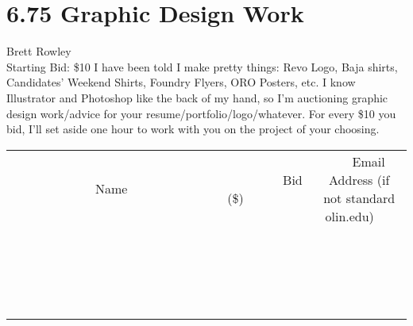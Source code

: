 \documentclass[11pt]{article}
\begin{document}
\section*{6.75 Graphic Design Work}
Brett Rowley
\\
Starting Bid: \$10
\newline
I have been told I make pretty things: Revo Logo, Baja shirts, Candidates' Weekend Shirts, Foundry Flyers, ORO Posters, etc. I know Illustrator and Photoshop like the back of my hand, so I'm auctioning graphic design work/advice for your resume/portfolio/logo/whatever. For every \$10 you bid, I'll set aside one hour to work with you on the project of your choosing.
\\[3ex]
\begin{tabular}{c c c}
~~~~~~~~~~~~~Name~~~~~~~~~~~~~ & ~~~~~~~~~Bid (\$)~~~~~~~~~  & ~~~Email Address (if not standard olin.edu)~~~\\
 & & \\
\hline
 & & \\
\hline
 & & \\
\hline
 & & \\
\hline
 & & \\
\hline
 & & \\
\hline
 & & \\
\hline
 & & \\
\hline
 & & \\
\hline
 & & \\
\hline
 & & \\
\hline
 & & \\
\hline
 & & \\
\hline
 & & \\
\hline
 & & \\
\hline
 & & \\
\hline
 & & \\
\hline
 & & \\
\hline
 & & \\
\hline
\end{tabular}
\newpage
\end{document}

